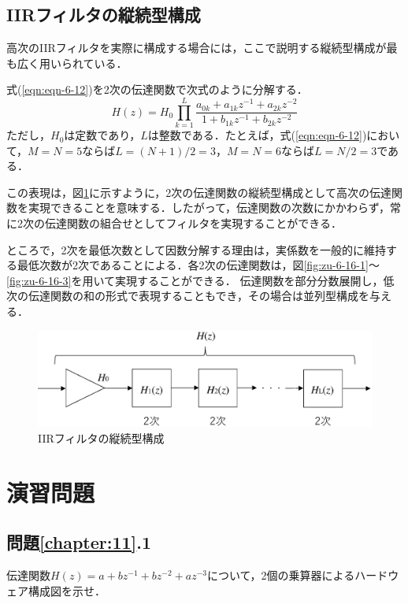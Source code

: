 \subsection{IIRフィルタの縦続型構成}

高次のIIRフィルタを実際に構成する場合には，ここで説明する縦続型構成が最も広く用いられている．

式(\ref{eqn:eqn-6-12})を2次の伝達関数で次式のように分解する．
\begin{equation}
H(z)=\displaystyle H_0 \prod_{k=1}^{L}\frac{a_{0k}+a_{1k}z^{-1}+a_{2k}z^{-2}}{1+b_{1k}z^{-1}+b_{2k}z^{-2}}
\end{equation}
ただし，$H_0$は定数であり，$L$は整数である．たとえば，式(\ref{eqn:eqn-6-12})において，$M=N=5$ならば$L=(N+1)/2=3$，$M=N=6$ならば$L=N/2=3$である．

この表現は，図\ref{fig:zu-6-18}に示すように，2次の伝達関数の縦続型構成として高次の伝達関数を実現できることを意味する．したがって，伝達関数の次数にかかわらず，常に2次の伝達関数の組合せとしてフィルタを実現することができる．

ところで，2次を最低次数として因数分解する理由は，実係数を一般的に維持する最低次数が2次であることによる．各2次の伝達関数は，図\ref{fig:zu-6-16-1}～\ref{fig:zu-6-16-3}を用いて実現することができる．
伝達関数を部分分数展開し，低次の伝達関数の和の形式で表現することもでき，その場合は並列型構成を与える．

\begin{figure}[H]
\begin{center}
\includegraphics[width=.8\textwidth]{fig/zu-6-18.eps}
\end{center}
\caption{IIRフィルタの縦続型構成}
\label{fig:zu-6-18}
\end{figure}


\section*{演習問題}

\subsection*{問題\ref{chapter:11}.1}

伝達関数$H(z)=a+bz^{-1}+bz^{-2}+az^{-3}$について，2個の乗算器によるハードウェア構成図を示せ．




